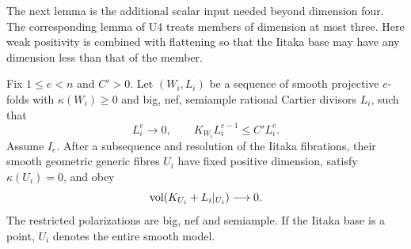 The next lemma is the additional scalar input needed beyond
dimension four.  The corresponding lemma of U4 treats members of
dimension at most three.  Here weak positivity is combined with
flattening so that the Iitaka base may have any dimension less than
that of the member.

\begin{lemma}
\label{lem:small-fibre-volume}
Fix $1\le e<n$ and $C'>0$.  Let $(W_i,L_i)$ be a sequence of
smooth projective $e$-folds with $\kappa(W_i)\ge0$ and big, nef,
semiample rational Cartier divisors $L_i$, such that
\begin{equation}\label{eq:small-volume-hypotheses}
                  L_i^e\longrightarrow0,
                  \qquad K_{W_i}L_i^{e-1}\le C'L_i^e.
\end{equation}
Assume $I_e$.  After a subsequence and resolution of the Iitaka
fibrations, their smooth geometric generic fibres $U_i$ have fixed
positive dimension, satisfy $\kappa(U_i)=0$, and obey
\begin{equation}\label{eq:small-fibre-volume}
                     \operatorname{vol}(K_{U_i}+L_i|_{U_i})\longrightarrow0.
\end{equation}
The restricted polarizations are big, nef and semiample.  If the
Iitaka base is a point, $U_i$ denotes the entire smooth model.
\end{lemma}

